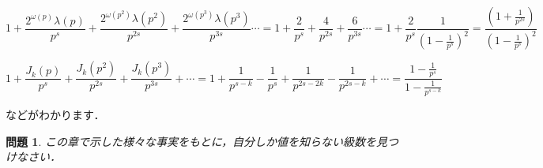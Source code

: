 \documentclass[./main]{subfiles}
\theoremstyle{break}
\newtheorem*{prb}{問題}
\begin{document}
\[1+\frac{2^{\omega(p)}\lambda(p)}{p^s}+\frac{2^{\omega(p^2)}\lambda(p^2)}{p^{2s}}+\frac{2^{\omega(p^3)}\lambda(p^3)}{p^{3s}}\cdots=1+\frac{2}{p^s}+\frac{4}{p^{2s}}+\frac{6}{p^{3s}}\cdots=1+\frac{2}{p^s}\frac{1}{\left( 1-\frac{1}{p^s} \right)^2}=\frac{\left( 1+\frac{1}{p^{2s}} \right)}{\left( 1-\frac{1}{p^s} \right)^2}\]

\[1+\frac{J_k(p)}{p^s}+\frac{J_k(p^2)}{p^{2s}}+\frac{J_k(p^3)}{p^{3s}}+\cdots=1+\frac{1}{p^{s-k}}-\frac{1}{p^s}+\frac{1}{p^{2s-2k}}-\frac{1}{p^{2s-k}}+\cdots=\frac{1-\frac{1}{p^s}}{1-\frac{1}{p^{s-k}}}\]

などがわかります．

\begin{prb}
この章で示した様々な事実をもとに，自分しか値を知らない級数を見つけなさい．
\end{prb}
\end{document}
